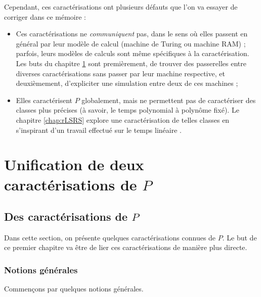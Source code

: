 \documentclass{report}
\begin{document}
	Cependant, ces caractérisations ont plusieurs défauts que l'on va essayer de corriger dans ce mémoire :
	
	\begin{itemize}
		\item 
				Ces caractérisations ne \emph{communiquent} pas, dans le sens où elles passent en général par leur modèle de calcul (machine de Turing ou machine RAM) ; parfois, leurs modèles de calculs sont même spécifiques à la caractérisation. Les buts du chapitre \ref{chap:unif_P} sont premièrement, de trouver des passerelles entre diverses caractérisations sans passer par leur machine respective, et deuxièmement, d'expliciter une simulation entre deux de ces machines ;
				
		\item 
				Elles caractérisent $P$ globalement, mais ne permettent pas de caractériser des classes plus précises (à savoir, le temps polynomial à polynôme fixé). Le chapitre \ref{chap:rLSRS} explore une caractérisation de telles classes en s'inspirant d'un travail effectué sur le temps linéaire \cite{GrandjeanSchwentick2002}.
	\end{itemize}
	
	
	\pagebreak
	
	\chapter{Unification de deux caractérisations de $P$}
	\label{chap:unif_P}
	
	\section{Des caractérisations de $P$}
		\label{sec:caracterisations_P}
	
		Dans cette section, on présente quelques caractérisations connues de $P$. Le but de ce premier chapitre va être de lier ces caractérisations de manière plus directe. 
	
		\subsection{Notions générales}
			\label{subsec:notions_generales}
		
			Commençons par quelques notions générales.
	
\end{document}
